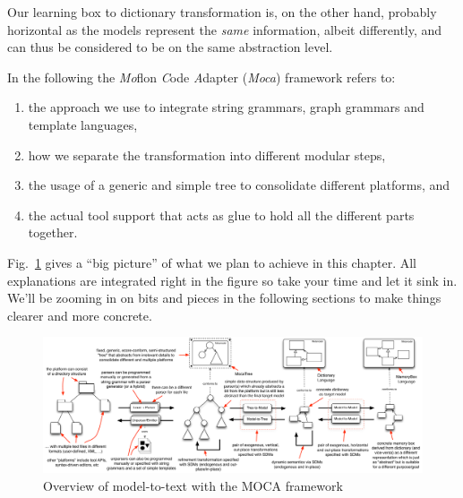 Our learning box to dictionary transformation is, on the other hand, probably horizontal as the models represent the \emph{same} information, albeit differently, and can thus be considered to be on the same abstraction level.

\vspace{1.5cm}


In the following the \emph{Mo}flon \emph{C}ode \emph{A}dapter (\emph{Moca}) framework refers to:
\begin{enumerate}
 \item the approach we use to integrate string grammars, graph grammars and template languages, 
 \item how we separate the transformation into different modular steps, 
 \item the usage of a generic and simple tree to consolidate different platforms, and 
 \item the actual tool support that acts as glue to hold all the different parts together.
\end{enumerate}
 
Fig.~\ref{fig:moca-overview} gives a ``big picture'' of what we plan to achieve in this chapter.
All explanations are integrated right in the figure so take your time and let it sink in.
We'll be zooming in on bits and pieces in the following sections to make things clearer and more concrete.
\begin{figure}[htp]
\begin{center}
 \includegraphics[angle=90, height=\textheight]{pics/moca/text-to-model}
  \caption{Overview of model-to-text with the MOCA framework}
  \label{fig:moca-overview}
\end{center}
\end{figure} 

%
 
